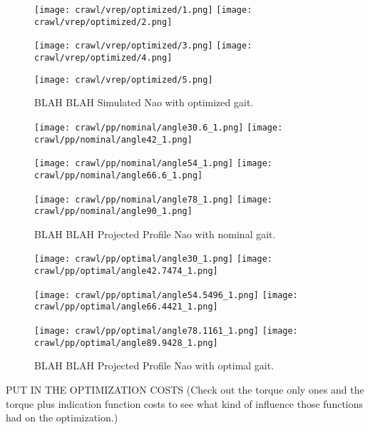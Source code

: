 \begin{figure}
  \centerline{
    \texttt{[image: crawl/vrep/optimized/1.png]}
    \texttt{[image: crawl/vrep/optimized/2.png]}
  }
  \vspace*{0.05in}
  \centerline{
    \texttt{[image: crawl/vrep/optimized/3.png]}
    \texttt{[image: crawl/vrep/optimized/4.png]}
  }
  \vspace*{0.05in}
  \centerline{
    \texttt{[image: crawl/vrep/optimized/5.png]}
  }
  \vspace*{-0.05in}
  \caption{BLAH BLAH Simulated Nao with optimized gait.}
  \label{fig:vrep_nao_opt_gait1}
  \vspace*{-0.01in}
  \vspace*{-0.05in}
\end{figure}

\begin{figure}
  \centerline{
    \texttt{[image: crawl/pp/nominal/angle30.6\_1.png]}
    \texttt{[image: crawl/pp/nominal/angle42\_1.png]}
  }
  \vspace*{0.05in}
  \centerline{
    \texttt{[image: crawl/pp/nominal/angle54\_1.png]}
    \texttt{[image: crawl/pp/nominal/angle66.6\_1.png]}
  }
  \vspace*{0.05in}
  \centerline{
    \texttt{[image: crawl/pp/nominal/angle78\_1.png]}
    \texttt{[image: crawl/pp/nominal/angle90\_1.png]}
  }
  \vspace*{-0.05in}
  \caption{BLAH BLAH Projected Profile Nao with nominal gait.}
  \label{fig:pp_nom_gait1}
  \vspace*{-0.01in}
  \vspace*{-0.05in}
\end{figure}

\begin{figure}
  \centerline{
    \texttt{[image: crawl/pp/optimal/angle30\_1.png]}
    \texttt{[image: crawl/pp/optimal/angle42.7474\_1.png]}
  }
  \vspace*{0.05in}
  \centerline{
    \texttt{[image: crawl/pp/optimal/angle54.5496\_1.png]}
    \texttt{[image: crawl/pp/optimal/angle66.4421\_1.png]}
  }
  \vspace*{0.05in}
  \centerline{
    \texttt{[image: crawl/pp/optimal/angle78.1161\_1.png]}
    \texttt{[image: crawl/pp/optimal/angle89.9428\_1.png]}
  }
  \vspace*{-0.05in}
  \caption{BLAH BLAH Projected Profile Nao with optimal gait.}
  \label{fig:pp_opt_gait1}
  \vspace*{-0.01in}
  \vspace*{-0.05in}
\end{figure}

PUT IN THE OPTIMIZATION COSTS (Check out the torque only ones and the torque plus indication
function costs to see what kind of influence those functions had on the optimization.)


